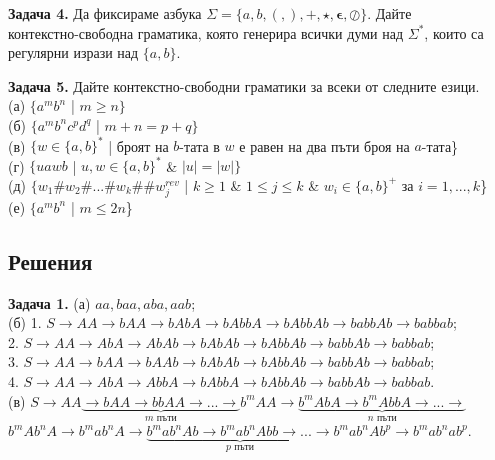 \documentclass[openany]{book}
\newcommand{\bleft}{
    \boldsymbol{\left(\right.}
}
\newcommand{\bright}{
    \boldsymbol{\left.\right)}
}
\newcommand{\bplus}{
    \boldsymbol{+}
}
\newcommand{\bepsilon}{
    \boldsymbol{\epsilon}
}
\begin{document}
    \vspace{15pt}

    \textbf{Задача 4.} Да фиксираме азбука $\Sigma = \{a,b,\bleft,\bright,\bplus,\star,\bepsilon,\oslash\}$.
    Дайте \\ контекстно-свободна граматика, която генерира всички думи над $\Sigma^*$, които са регулярни изрази
    над $\{a,b\}$.

    \vspace{15pt}

    \textbf{Задача 5.} Дайте контекстно-свободни граматики за всеки от следните езици. \\
    (а) $\{a^mb^n$ | $m \geq n\}$ \\
    (б) $\{a^mb^nc^pd^q$ | $m + n = p + q\}$ \\
    (в) $\{w \in \{a,b\}^*$ | броят на $b$-тата в $w$ е равен на два пъти броя на $a$-тата\} \\
    (г) $\{uawb$ | $u,w \in \{a,b\}^*$ \& $|u| = |w|\}$ \\
    (д) $\{w_1\#w_2\#...\#w_k\#\#w_j^{rev}$ | $k \geq 1$ \& $1 \leq j \leq k$ \& $w_i \in \{a,b\}^+$ за $i = 1,...,k$\} \\
    (е) $\{a^mb^n$ | $m \leq 2n$\}
\vspace{25pt}

\subsection{Решения}
    \textbf{Задача 1.} (а) $aa,baa,aba,aab$; \\
    (б) 1. $S \rightarrow AA \rightarrow bAA \rightarrow bAbA \rightarrow bAbbA \rightarrow bAbbAb \rightarrow babbAb \rightarrow babbab$; \\
    2. $S \rightarrow AA \rightarrow AbA \rightarrow AbAb \rightarrow bAbAb \rightarrow bAbbAb \rightarrow babbAb \rightarrow babbab$; \\
    3. $S \rightarrow AA \rightarrow bAA \rightarrow bAAb \rightarrow bAbAb \rightarrow bAbbAb \rightarrow babbAb \rightarrow babbab$; \\
    4. $S \rightarrow AA \rightarrow AbA \rightarrow AbbA \rightarrow bAbbA \rightarrow bAbbAb \rightarrow babbAb \rightarrow babbab$. \\
    (в) $S \rightarrow AA \underbrace{\rightarrow bAA \rightarrow bbAA \rightarrow ... \rightarrow}_\text{$m$ пъти} b^mAA \rightarrow \underbrace{b^mAbA \rightarrow b^mAbbA \rightarrow ... \rightarrow}_\text{$n$ пъти}$ \\  $b^mAb^nA \rightarrow b^mab^nA \rightarrow \underbrace{b^mab^nAb \rightarrow b^mab^nAbb \rightarrow ... \rightarrow}_\text{$p$ пъти} b^mab^nAb^p \rightarrow b^mab^nab^p$.
\end{document}
